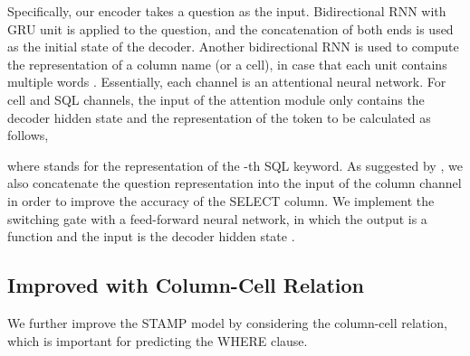 \documentclass[11pt,a4paper]{article}
\begin{document}
Specifically, our encoder takes a question as the input. Bidirectional RNN with GRU unit is applied to the question, and the concatenation of both ends is used as the initial state of the decoder.
Another bidirectional RNN is used to compute the representation of a column name (or a cell), in case that each unit contains multiple words  \cite{dong2015hybrid}.
Essentially, each channel is an attentional neural network.
For cell and SQL channels, the input of the attention module only contains the decoder hidden state and the representation of the token to be calculated as follows,

where  stands for the representation of the -th SQL keyword.
As suggested by \cite{zhong2017seq2sql}, we also concatenate the question representation into the input of the column channel in order to improve the accuracy of the SELECT column.
We implement the switching gate with a feed-forward neural network, in which the output is a  function and the input is the decoder hidden state .


\subsection{Improved with Column-Cell Relation}
\label{section:improved-column-cell}
We further improve the STAMP model by considering the column-cell relation,
which is important for predicting the WHERE clause.
\end{document}
